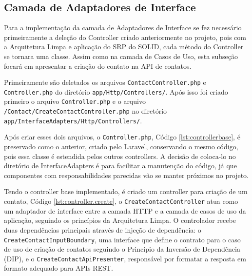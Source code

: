 \subsection{Camada de Adaptadores de Interface}
    \par Para a implementação da camada de Adaptadores de Interface se fez necessário primeiramente a deleção do Controller criado anteriormente no projeto, pois com a Arquitetura Limpa e aplicação do SRP do SOLID, cada método do Controller se tornara uma classe. Assim como na camada de Casos de Uso, esta subseção focará em apresentar a criação do contato na API de contatos.

    \par Primeiramente são deletados os arquivos \texttt{ContactController.php} e \texttt{Controller.php} do diretório \texttt{app/Http/Controllers/}. 
    Após isso foi criado primeiro o arquivo \texttt{Controller.php} e o arquivo \texttt{/Contact/CreateContactController.php} no diretório \texttt{app/InterfaceAdapters/Http/Controllers/}.

    \par Após criar esses dois arquivos, o \texttt{Controller.php}, Código \ref{lst:controllerbase}, é preservado como o anterior, criado pelo Laravel, conservando o mesmo código, pois essa classe é estendida pelos outros controllers. A decisão de coloca-lo no diretório de InterfaceAdapters é para facilitar a manutenção do código, já que componentes com responsabilidades parecidas vão se manter próximos no projeto.

    

    \par Tendo o controller base implementado, é criado um controller para criação de um contato, Código \ref{lst:controller.create}, o \texttt{CreateContactController} atua como um adaptador de interface entre a camada HTTP e a camada de casos de uso da aplicação, seguindo os princípios da Arquitetura Limpa. O controlador recebe duas dependências principais através de injeção de dependência: o \texttt{CreateContactInputBoundary}, uma interface que define o contrato para o caso de uso de criação de contatos seguindo o Princípio da Inversão de Dependência (DIP), e o \texttt{CreateContactApiPresenter}, responsável por formatar a resposta em formato adequado para APIs REST.
    
